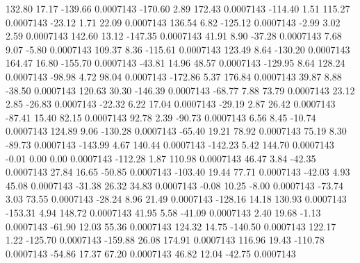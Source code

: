       132.80       17.17     -139.66     0.0007143
     -170.60        2.89      172.43     0.0007143
     -114.40        1.51      115.27     0.0007143
      -23.12        1.71       22.09     0.0007143
      136.54        6.82     -125.12     0.0007143
       -2.99        3.02        2.59     0.0007143
      142.60       13.12     -147.35     0.0007143
       41.91        8.90      -37.28     0.0007143
        7.68        9.07       -5.80     0.0007143
      109.37        8.36     -115.61     0.0007143
      123.49        8.64     -130.20     0.0007143
      164.47       16.80     -155.70     0.0007143
      -43.81       14.96       48.57     0.0007143
     -129.95        8.64      128.24     0.0007143
      -98.98        4.72       98.04     0.0007143
     -172.86        5.37      176.84     0.0007143
       39.87        8.88      -38.50     0.0007143
      120.63       30.30     -146.39     0.0007143
      -68.77        7.88       73.79     0.0007143
       23.12        2.85      -26.83     0.0007143
      -22.32        6.22       17.04     0.0007143
      -29.19        2.87       26.42     0.0007143
      -87.41       15.40       82.15     0.0007143
       92.78        2.39      -90.73     0.0007143
        6.56        8.45      -10.74     0.0007143
      124.89        9.06     -130.28     0.0007143
      -65.40       19.21       78.92     0.0007143
       75.19        8.30      -89.73     0.0007143
     -143.99        4.67      140.44     0.0007143
     -142.23        5.42      144.70     0.0007143
       -0.01        0.00        0.00     0.0007143
     -112.28        1.87      110.98     0.0007143
       46.47        3.84      -42.35     0.0007143
       27.84       16.65      -50.85     0.0007143
     -103.40       19.44       77.71     0.0007143
      -42.03        4.93       45.08     0.0007143
      -31.38       26.32       34.83     0.0007143
       -0.08       10.25       -8.00     0.0007143
      -73.74        3.03       73.55     0.0007143
      -28.24        8.96       21.49     0.0007143
     -128.16       14.18      130.93     0.0007143
     -153.31        4.94      148.72     0.0007143
       41.95        5.58      -41.09     0.0007143
        2.40       19.68       -1.13     0.0007143
      -61.90       12.03       55.36     0.0007143
      124.32       14.75     -140.50     0.0007143
      122.17        1.22     -125.70     0.0007143
     -159.88       26.08      174.91     0.0007143
      116.96       19.43     -110.78     0.0007143
      -54.86       17.37       67.20     0.0007143
       46.82       12.04      -42.75     0.0007143
